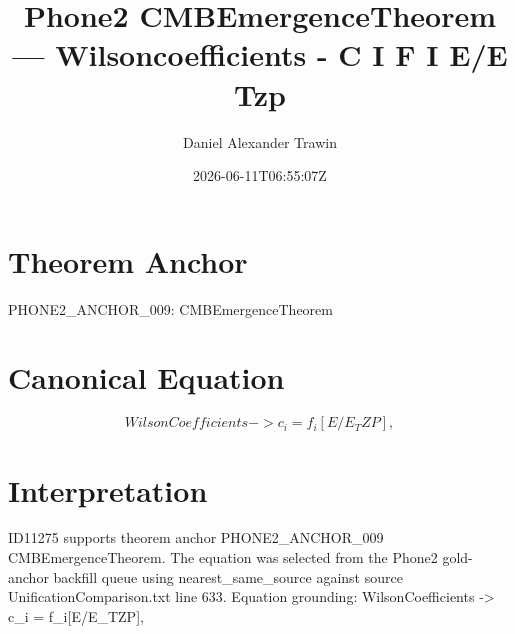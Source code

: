 \documentclass[11pt]{article}
\title{Phone2 CMBEmergenceTheorem — Wilsoncoefficients - C I F I E/E Tzp}
\author{Daniel Alexander Trawin}
\date{2026-06-11T06:55:07Z}
\begin{document}
\maketitle
\section*{Theorem Anchor}
PHONE2_ANCHOR_009: CMBEmergenceTheorem
\section*{Canonical Equation}
\[
WilsonCoefficients -> {c_i = f_i[E/E_TZP]},
\]
\section*{Interpretation}
ID11275 supports theorem anchor PHONE2_ANCHOR_009 CMBEmergenceTheorem. The equation was selected from the Phone2 gold-anchor backfill queue using nearest_same_source against source UnificationComparison.txt line 633. Equation grounding: WilsonCoefficients -> {c_i = f_i[E/E_TZP]},
\end{document}
